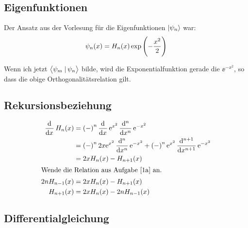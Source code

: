 \subsection{Eigenfunktionen}

Der Ansatz aus der Vorlesung für die Eigenfunktionen $\left| \psi_n \right\rangle$ war:
\[
	\psi_n(x) = H_n(x) \exp\del{-\frac{x^2}2}
\]

Wenn ich jetzt $\braket{\psi_m}{\psi_n}$ bilde, wird die Exponentialfunktion
gerade die $\ee^{-x^2}$, so dass die obige Orthogonalitätsrelation gilt.

\subsection{Rekursionsbeziehung}

\begin{align*}
	\dod{}x H_n(x)
	&= \del-^n \dod{}x \ee^{x^2} \dod[n]{}x \ee^{-x^2} \\
	&= \del-^n 2x \ee^{x^2} \dod[n]{}x \ee^{-x^2} + \del-^n \ee^{x^2} \dod[n+1]{}x \ee^{-x^2} \\
	&= 2x H_n(x) - H_{n+1}(x) \\
	\intertext{%
		Wende die Relation aus Aufgabe \ref{1a} an.
	}
	2n H_{n-1}(x)
	&= 2x H_n(x) - H_{n+1}(x) \\
	H_{n+1}(x)
	&= 2x H_n(x) - 2n H_{n-1}(x)
\end{align*}

\subsection{Differentialgleichung}

\fehlt


\IfFileExists{\bibliographyfile}{
	
}{}



